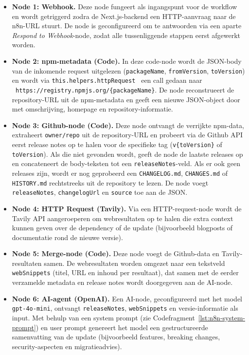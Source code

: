 \begin{itemize}
    \item \textbf{Node 1: Webhook.} Deze node fungeert als ingangspunt voor de workflow en wordt getriggerd zodra de Next.js-backend een HTTP-aanvraag naar de n8n-URL stuurt. De node is geconfigureerd om te antwoorden via een aparte \emph{Respond to Webhook}-node, zodat alle tussenliggende stappen eerst afgewerkt worden.
    \item \textbf{Node 2: npm-metadata (Code).} In deze code-node wordt de JSON-body van de inkomende request uitgelezen (\texttt{packageName}, \texttt{fromVersion}, \texttt{toVersion}) en wordt via \texttt{this.helpers.httpRequest } een call gedaan naar \\ \texttt{ https://registry.npmjs.org/\{packageName\}}. De node reconstrueert de repository-URL uit de npm-metadata en geeft een nieuwe JSON-object door met omschrijving, homepage en repository-informatie.
    \item \textbf{Node 3: Github-node (Code).} Deze node ontvangt de verrijkte npm-data, extraheert \texttt{owner/repo} uit de repository-URL en probeert via de Github API eerst release notes op te halen voor de specifieke tag (\texttt{v\{toVersion\}} of \texttt{toVersion}). Als die niet gevonden wordt, geeft de node de laatste releases op en concateneert de body-teksten tot een \texttt{releaseNotes}-veld. Als er ook geen releases zijn, wordt er nog geprobeerd een \texttt{CHANGELOG.md}, \texttt{CHANGES.md} of \texttt{HISTORY.md} rechtstreeks uit de repository te lezen. De node voegt \texttt{releaseNotes}, \texttt{changelogUrl} en \texttt{source} toe aan de JSON.
    \item \textbf{Node 4: HTTP Request (Tavily).} Via een HTTP-request-node wordt de Tavily API aangeroeperen om webresultaten op te halen die extra context kunnen geven over de dependency of de update (bijvoorbeeld blogposts of documentatie rond de nieuwe versie).
    \item \textbf{Node 5: Merge-node (Code).} Deze node voegt de Github-data en Tavily-resultaten samen. De webresultaten worden omgezet naar een tekstveld \texttt{webSnippets} (titel, URL en inhoud per resultaat), dat samen met de eerder verzamelde metadata en release notes wordt doorgegeven aan de AI-node.
    \item \textbf{Node 6: AI-agent (OpenAI).} Een AI-node, geconfigureerd met het model \texttt{gpt-4o-mini}, ontvangt \texttt{releaseNotes}, \texttt{webSnippets} en versie-informatie als input. Met behulp van een system prompt (zie Codefragment~\ref{lst:n8n-system-prompt}) en user prompt genereert het model een gestructureerde samenvatting van de update (bijvoorbeeld features, breaking changes, security-aspecten en migratieadvies).

\end{itemize}
